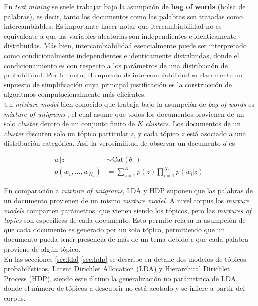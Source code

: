 \documentclass[letterpaper,12pt,oneside]{book} %
\begin{document}
En \textit{text mining} se suele trabajar bajo la asumpción de \textbf{bag of words} (bolsa de palabras), es decir, tanto los documentos como las palabras son tratadas como intercambiables. Es importante hacer notar que itercambiabilidad no es equivalente a que las variables aleatorias son independientes e identicamente distribuidas. Más bien, intercambiabilidad esencialmente puede ser interpretado como condicionalmente independientes e identicamente distribuidas, donde el condicionamiento es con respecto a los parámetros de una distribución de probabilidad. Por lo tanto, el supuesto de intercambiabilidad es claramente un supuesto de simplificación cuya principal justificación es la construcción de algoritmos computacionalmente más eficientes.\\

Un \textit{mixture model} bien conocido que trabaja bajo la asumpción de \textit{bag of words} es \textit{mixture of unigrams} \citep{nigam2000text}, el cual asume que todos los documentos provienen de un solo \textit{cluster} dentro de un conjunto finito de $K$ \textit{clusters}. Los documentos de un \textit{cluster} discuten solo un tópico particular $z$, y cada tópico $z$ está asociado a una distribución categórica. Así, la verosimilitud de observar un documento $d$ es

\begin{align}
    w|z &\sim \text{Cat}(\theta_{z})\\
    p(w_{1}, \ldots, w_{N_{d}}) &= \sum_{z=1}^{K}p(z)\prod_{i=1}^{N_{d}}p(w_{i}|z)
\end{align}

En comparación a \textit{mixture of unigrams}, LDA y HDP suponen que las palabras de un documento provienen de un mismo \textit{mixture model}. A nivel corpus los \textit{mixture models} comparten parámetros, que vienen siendo los tópicos, pero las \textit{mixtures of topics} son específicas de cada documento. Esto permite relajar la asumpción de que cada documento es generado por un solo tópico, permitiendo que un documento pueda tener presencia de más de un tema debido a que cada palabra proviene de algún tópico.\\

En las secciones \ref{sec:lda}-\ref{sec:hdp} se describe en detalle dos modelos de tópicos probabilísticos, Latent Dirichlet Allocation (LDA) y Hierarchical Dirichlet Process (HDP), siendo este último la generalización no parámetrica de LDA, donde el número de tópicos a descubrir no está acotado y se infiere a partir del corpus.\\
\end{document}
